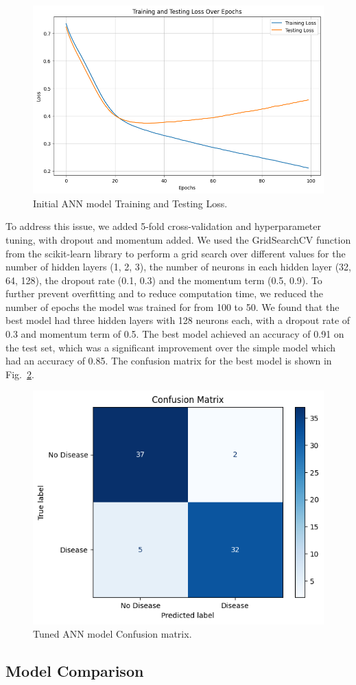 \begin{figure}[htbp]
    \centerline{\includegraphics[scale=0.435]{img/annoverfitting.png}}
    \caption{Initial ANN model Training and Testing Loss.}\label{annoverfitting}
\end{figure}

To address this issue, we added 5-fold cross-validation and hyperparameter tuning, with dropout and momentum added. We used the GridSearchCV function from the scikit-learn library to perform a grid search over different values for the number of hidden layers (1, 2, 3), the number of neurons in each hidden layer (32, 64, 128), the dropout rate (0.1, 0.3) and the momentum term (0.5, 0.9). To further prevent overfitting and to reduce computation time, we reduced the number of epochs the model was trained for from 100 to 50. We found that the best model had three hidden layers with 128 neurons each, with a dropout rate of 0.3 and momentum term of 0.5. The best model achieved an accuracy of 0.91 on the test set, which was a significant improvement over the simple model which had an accuracy of 0.85. The confusion matrix for the best model is shown in Fig.~\ref{annconfusion}.

\begin{figure}[htbp]
    \centerline{\includegraphics[scale=.65]{img/annconfusion.png}}
    \caption{Tuned ANN model Confusion matrix.}\label{annconfusion}
\end{figure}

\subsection{Model Comparison}